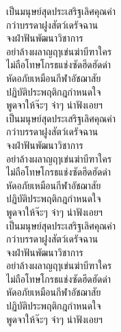 \documentclass[twocolumn,a4paper]{article}
\begin{document}
เป็นมนุษย์สุดประเสริฐเลิศคุณค่า\\
กว่าบรรดาฝูงสัตว์เดรัจฉาน \\
จงฝ่าฟันพัฒนาวิชาการ \\
อย่าล้างผลาญฤๅเข่นฆ่าบีฑาใคร\\ 
ไม่ถือโทษโกรธแช่งซัดฮึดฮัดด่า \\
หัดอภัยเหมือนกีฬาอัชฌาสัย \\
ปฏิบัติประพฤติกฎกำหนดใจ \\
พูดจาให้จ๊ะๆ จ๋าๆ น่าฟังเอยฯ\\ 

เป็นมนุษย์สุดประเสริฐเลิศคุณค่า\\
กว่าบรรดาฝูงสัตว์เดรัจฉาน \\
จงฝ่าฟันพัฒนาวิชาการ \\
อย่าล้างผลาญฤๅเข่นฆ่าบีฑาใคร\\ 
ไม่ถือโทษโกรธแช่งซัดฮึดฮัดด่า \\
หัดอภัยเหมือนกีฬาอัชฌาสัย \\
ปฏิบัติประพฤติกฎกำหนดใจ \\
พูดจาให้จ๊ะๆ จ๋าๆ น่าฟังเอยฯ\\ 

เป็นมนุษย์สุดประเสริฐเลิศคุณค่า\\
กว่าบรรดาฝูงสัตว์เดรัจฉาน \\
จงฝ่าฟันพัฒนาวิชาการ \\
อย่าล้างผลาญฤๅเข่นฆ่าบีฑาใคร\\ 
ไม่ถือโทษโกรธแช่งซัดฮึดฮัดด่า \\
หัดอภัยเหมือนกีฬาอัชฌาสัย \\
ปฏิบัติประพฤติกฎกำหนดใจ \\
พูดจาให้จ๊ะๆ จ๋าๆ น่าฟังเอยฯ\\ 
\end{document}
